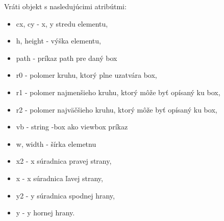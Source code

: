 Vráti objekt s nasledujúcimi atribútmi: 
\begin{itemize}
	\item cx, cy - x, y stredu elementu,
	\item h, height - výška elementu,
	\item path - príkaz path pre daný box
	\item r0 - polomer kruhu, ktorý plne uzatvára box, 
	\item r1 - polomer najmenšieho kruhu, ktorý môže byť opísaný ku box,
	\item r2 - polomer najväčšieho kruhu, ktorý môže byť opísaný ku box, 
	\item vb - string -box ako viewbox príkaz
	\item w, width - šírka elemetnu 
	\item x2 - x súradnica pravej strany, 
	\item x - x súradnica ľavej strany, 
	\item y2 - y súradnica spodnej hrany, 
	\item y - y hornej hrany. 
\end{itemize}